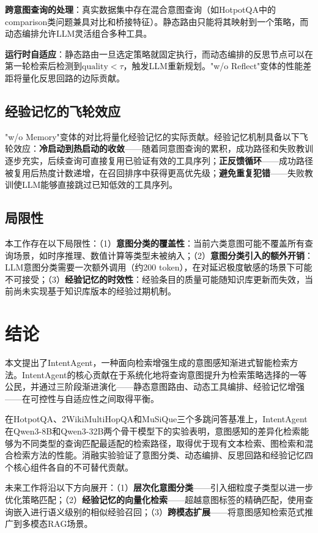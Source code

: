 \documentclass[runningheads]{llncs}
\begin{document}
\textbf{跨意图查询的处理}：真实数据集中存在混合意图查询（如HotpotQA中的comparison类问题兼具对比和桥接特征）。静态路由只能将其映射到一个策略，而动态编排允许LLM灵活组合多种工具。

\textbf{运行时自适应}：静态路由一旦选定策略就固定执行，而动态编排的反思节点可以在第一轮检索后检测到$\text{quality} < \tau$，触发LLM重新规划。"w/o Reflect"变体的性能差距将量化反思回路的边际贡献。

\subsection{经验记忆的飞轮效应}

"w/o Memory"变体的对比将量化经验记忆的实际贡献。经验记忆机制具备以下飞轮效应：\textbf{冷启动到热启动的收敛}——随着同意图查询的累积，成功路径和失败教训逐步充实，后续查询可直接复用已验证有效的工具序列；\textbf{正反馈循环}——成功路径被复用后热度计数递增，在召回排序中获得更高优先级；\textbf{避免重复犯错}——失败教训使LLM能够直接跳过已知低效的工具序列。

\subsection{局限性}

本工作存在以下局限性：（1）\textbf{意图分类的覆盖性}：当前六类意图可能不覆盖所有查询场景，如时序推理、数值计算等类型未被纳入；（2）\textbf{意图分类引入的额外开销}：LLM意图分类需要一次额外调用（约200 token），在对延迟极度敏感的场景下可能不可接受；（3）\textbf{经验记忆的时效性}：经验条目的质量可能随知识库更新而失效，当前尚未实现基于知识库版本的经验过期机制。

\section{结论}

本文提出了IntentAgent，一种面向检索增强生成的意图感知渐进式智能检索方法。IntentAgent的核心贡献在于系统化地将查询意图提升为检索策略选择的一等公民，并通过三阶段渐进演化——静态意图路由、动态工具编排、经验记忆增强——在可控性与自适应性之间取得平衡。

在HotpotQA、2WikiMultiHopQA和MuSiQue三个多跳问答基准上，IntentAgent在Qwen3-8B和Qwen3-32B两个骨干模型下的实验表明，意图感知的差异化检索能够为不同类型的查询匹配最适配的检索路径，取得优于现有文本检索、图检索和混合检索方法的性能。消融实验验证了意图分类、动态编排、反思回路和经验记忆四个核心组件各自的不可替代贡献。

未来工作将沿以下方向展开：（1）\textbf{层次化意图分类}——引入细粒度子类型以进一步优化策略匹配；（2）\textbf{经验记忆的向量化检索}——超越意图标签的精确匹配，使用查询嵌入进行语义级别的相似经验召回；（3）\textbf{跨模态扩展}——将意图感知检索范式推广到多模态RAG场景。



\end{document}
